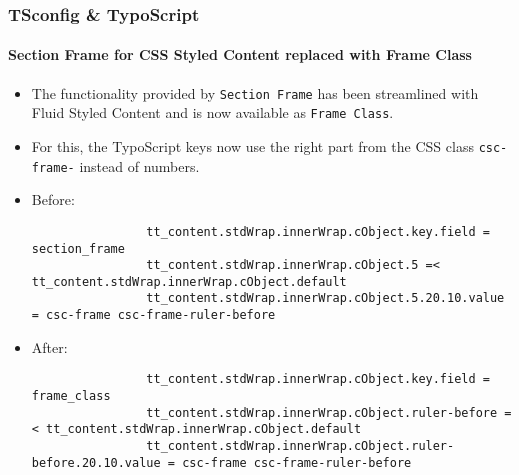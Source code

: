 \begin{frame}[fragile]
	\frametitle{TSconfig \& TypoScript}
	\framesubtitle{Section Frame for CSS Styled Content replaced with Frame Class}

	\lstset{basicstyle=\tiny\ttfamily}

	\begin{itemize}
		\item The functionality provided by \texttt{Section Frame} has been streamlined with Fluid Styled Content and is now available as \texttt{Frame Class}.
		\item For this, the TypoScript keys now use the right part from the CSS class \texttt{csc-frame-} instead of numbers.
		\item Before:

			\begin{lstlisting}
				tt_content.stdWrap.innerWrap.cObject.key.field = section_frame
				tt_content.stdWrap.innerWrap.cObject.5 =< tt_content.stdWrap.innerWrap.cObject.default
				tt_content.stdWrap.innerWrap.cObject.5.20.10.value = csc-frame csc-frame-ruler-before
			\end{lstlisting}

		\item After:

			\begin{lstlisting}
				tt_content.stdWrap.innerWrap.cObject.key.field = frame_class
				tt_content.stdWrap.innerWrap.cObject.ruler-before =< tt_content.stdWrap.innerWrap.cObject.default
				tt_content.stdWrap.innerWrap.cObject.ruler-before.20.10.value = csc-frame csc-frame-ruler-before
			\end{lstlisting}

	\end{itemize}

\end{frame}

